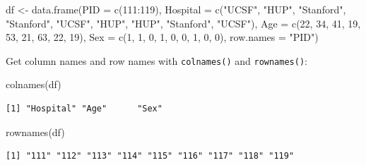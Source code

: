 \documentclass[
]{book}
\newenvironment{Shaded}{\begin{snugshade}}{\end{snugshade}}
\newcommand{\AttributeTok}[1]{\textcolor[rgb]{0.77,0.63,0.00}{#1}}
\newcommand{\DecValTok}[1]{\textcolor[rgb]{0.00,0.00,0.81}{#1}}
\newcommand{\FunctionTok}[1]{\textcolor[rgb]{0.00,0.00,0.00}{#1}}
\newcommand{\NormalTok}[1]{#1}
\newcommand{\OtherTok}[1]{\textcolor[rgb]{0.56,0.35,0.01}{#1}}
\newcommand{\SpecialCharTok}[1]{\textcolor[rgb]{0.00,0.00,0.00}{#1}}
\newcommand{\StringTok}[1]{\textcolor[rgb]{0.31,0.60,0.02}{#1}}
\begin{document}
\begin{Shaded}
\begin{Highlighting}[]
\NormalTok{df }\OtherTok{\textless{}{-}} \FunctionTok{data.frame}\NormalTok{(}\AttributeTok{PID =} \FunctionTok{c}\NormalTok{(}\DecValTok{111}\SpecialCharTok{:}\DecValTok{119}\NormalTok{),}
                \AttributeTok{Hospital =} \FunctionTok{c}\NormalTok{(}\StringTok{"UCSF"}\NormalTok{, }\StringTok{"HUP"}\NormalTok{, }\StringTok{"Stanford"}\NormalTok{,}
                             \StringTok{"Stanford"}\NormalTok{, }\StringTok{"UCSF"}\NormalTok{, }\StringTok{"HUP"}\NormalTok{, }
                             \StringTok{"HUP"}\NormalTok{, }\StringTok{"Stanford"}\NormalTok{, }\StringTok{"UCSF"}\NormalTok{),}
                \AttributeTok{Age =} \FunctionTok{c}\NormalTok{(}\DecValTok{22}\NormalTok{, }\DecValTok{34}\NormalTok{, }\DecValTok{41}\NormalTok{, }\DecValTok{19}\NormalTok{, }\DecValTok{53}\NormalTok{, }\DecValTok{21}\NormalTok{, }\DecValTok{63}\NormalTok{, }\DecValTok{22}\NormalTok{, }\DecValTok{19}\NormalTok{),}
                \AttributeTok{Sex =} \FunctionTok{c}\NormalTok{(}\DecValTok{1}\NormalTok{, }\DecValTok{1}\NormalTok{, }\DecValTok{0}\NormalTok{, }\DecValTok{1}\NormalTok{, }\DecValTok{0}\NormalTok{, }\DecValTok{0}\NormalTok{, }\DecValTok{1}\NormalTok{, }\DecValTok{0}\NormalTok{, }\DecValTok{0}\NormalTok{),}
                \AttributeTok{row.names =} \StringTok{"PID"}\NormalTok{)}
\end{Highlighting}
\end{Shaded}

Get column names and row names with \texttt{colnames()} and \texttt{rownames()}:

\begin{Shaded}
\begin{Highlighting}[]
\FunctionTok{colnames}\NormalTok{(df)}
\end{Highlighting}
\end{Shaded}

\begin{verbatim}
[1] "Hospital" "Age"      "Sex"     
\end{verbatim}

\begin{Shaded}
\begin{Highlighting}[]
\FunctionTok{rownames}\NormalTok{(df)}
\end{Highlighting}
\end{Shaded}

\begin{verbatim}
[1] "111" "112" "113" "114" "115" "116" "117" "118" "119"
\end{verbatim}
\end{document}
